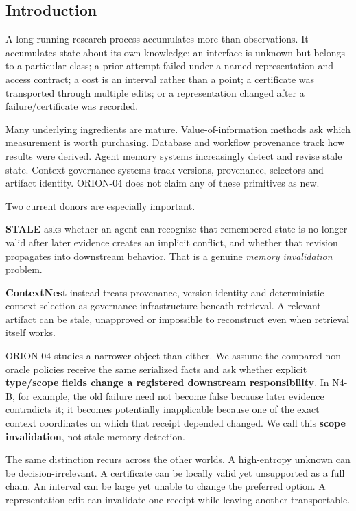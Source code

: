 \documentclass[10pt]{article}
\begin{document}
\hypertarget{introduction}{%
\subsection{Introduction}\label{introduction}}

A long-running research process accumulates more than observations. It
accumulates state about its own knowledge: an interface is unknown but
belongs to a particular class; a prior attempt failed under a named
representation and access contract; a cost is an interval rather than a
point; a certificate was transported through multiple edits; or a
representation changed after a failure/certificate was recorded.

Many underlying ingredients are mature. Value-of-information methods
\citep{russell1991rightthing} ask which measurement is worth purchasing.
Database and workflow provenance
\citep{buneman2001provenance, cheney2009provenance} track how results
were derived. Agent memory systems increasingly detect and revise stale
state. Context-governance systems track versions, provenance, selectors
and artifact identity. ORION-04 does not claim any of these primitives
as new.

Two current donors are especially important.

\textbf{STALE} asks whether an agent can recognize that remembered state
is no longer valid after later evidence creates an implicit conflict,
and whether that revision propagates into downstream behavior. That is a
genuine \emph{memory invalidation} problem.

\textbf{ContextNest} instead treats provenance, version identity and
deterministic context selection as governance infrastructure beneath
retrieval. A relevant artifact can be stale, unapproved or impossible to
reconstruct even when retrieval itself works.

ORION-04 studies a narrower object than either. We assume the compared
non-oracle policies receive the same serialized facts and ask whether
explicit \textbf{type/scope fields change a registered downstream
responsibility}. In N4-B, for example, the old failure need not become
false because later evidence contradicts it; it becomes potentially
inapplicable because one of the exact context coordinates on which that
receipt depended changed. We call this \textbf{scope invalidation}, not
stale-memory detection.

The same distinction recurs across the other worlds. A high-entropy
unknown can be decision-irrelevant. A certificate can be locally valid
yet unsupported as a full chain. An interval can be large yet unable to
change the preferred option. A representation edit can invalidate one
receipt while leaving another transportable.
\end{document}
